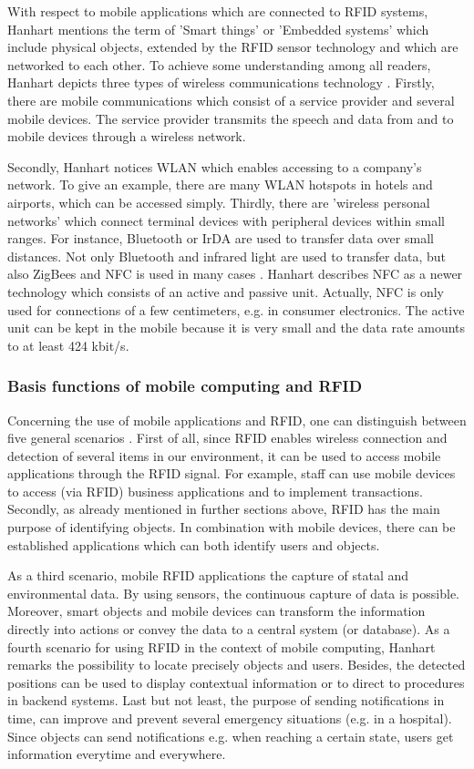 With respect to mobile applications which are connected to RFID systems, Hanhart mentions the term of 'Smart things' or 'Embedded systems' which include physical objects, extended by the RFID sensor technology and which are networked to each other. To achieve some understanding among all readers, Hanhart depicts three types of wireless communications technology \cite[p.12-13]{mobile}. Firstly, there are mobile communications which consist of a service provider and several mobile devices. The service provider transmits the speech and data from and to mobile devices through a wireless network. 

Secondly, Hanhart notices \ac{WLAN} which enables accessing to a company's network. To give an example, there are many WLAN hotspots in hotels and airports, which can be accessed simply. Thirdly, there are 'wireless personal networks' which connect terminal devices with peripheral devices within small ranges. For instance, Bluetooth or \ac{IrDA} are used to transfer data over small distances. Not only Bluetooth and infrared light are used to transfer data, but also ZigBees and \ac{NFC} is used in many cases \cite[p.12-13]{mobile}. Hanhart describes NFC as a newer technology which consists of an active and passive unit. Actually, NFC is only used for connections of a few centimeters, e.g. in consumer electronics. The active unit can be kept in the mobile because it is very small and the data rate amounts to at least 424 kbit/s.
 
\subsubsection{Basis functions of mobile computing and RFID}

Concerning the use of mobile applications and RFID, one can distinguish between five general scenarios \cite[p.13 ff.]{mobile}. First of all, since RFID enables wireless connection and detection of several items in our environment, it can be used to access mobile applications through the RFID signal. For example, staff can use mobile devices to access (via RFID) business applications and to implement transactions. Secondly, as already mentioned in further sections above, RFID has the main purpose of identifying objects. In combination with mobile devices, there can be established applications which can both identify users and objects.

As a third scenario, mobile RFID applications the capture of statal and environmental data. By using sensors, the continuous capture of data is possible. Moreover, smart objects and mobile devices can transform the information directly into actions or convey the data to a central system (or database). As a fourth scenario for using RFID in the context of mobile computing, Hanhart \cite[p.13 ff.]{mobile} remarks the possibility to locate precisely objects and users. Besides, the detected positions can be used to display contextual information or to direct to procedures in backend systems. Last but not least, the purpose of sending notifications in time, can improve and prevent several emergency situations (e.g. in a hospital). Since objects can send notifications e.g. when reaching a certain state, users get information everytime and everywhere.  

